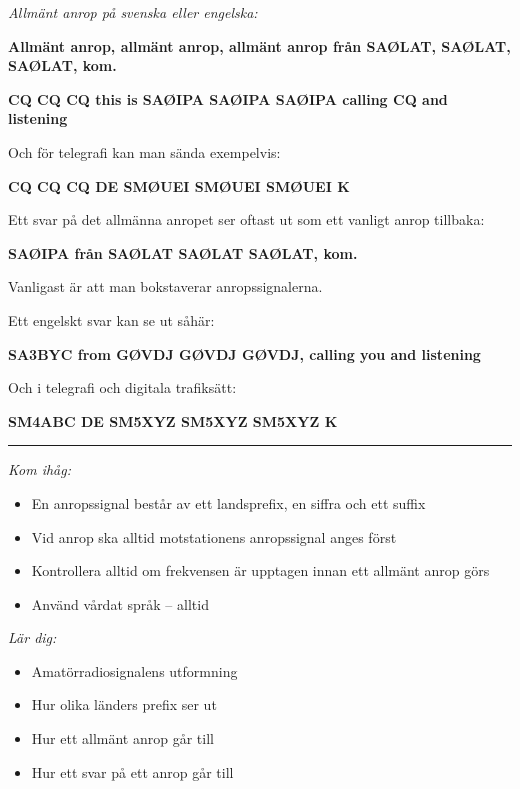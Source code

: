 \textit{Allmänt anrop på svenska eller engelska:}

\textbf{Allmänt anrop, allmänt anrop, allmänt anrop från SAØLAT,
  SAØLAT, SAØLAT, kom.}

\textbf{CQ CQ CQ this is SAØIPA SAØIPA SAØIPA calling CQ and
  listening}

Och för telegrafi kan man sända exempelvis:

\textbf{CQ CQ CQ DE SMØUEI SMØUEI SMØUEI K}

Ett svar på det allmänna anropet ser oftast ut som ett vanligt anrop
tillbaka:

\textbf{SAØIPA från SAØLAT SAØLAT SAØLAT, kom.}

Vanligast är att man bokstaverar anropssignalerna.

Ett engelskt svar kan se ut såhär:

\textbf{SA3BYC from GØVDJ GØVDJ GØVDJ, calling you and listening}

Och i telegrafi och digitala trafiksätt:

\textbf{SM4ABC DE SM5XYZ SM5XYZ SM5XYZ K}

\vspace{1em} \hrule \vspace{1em}

\emph{Kom ihåg:}

\begin{itemize}
  \item En anropssignal består av ett landsprefix, en siffra och ett
    suffix
  \item Vid anrop ska alltid motstationens anropssignal anges först

  \item Kontrollera alltid om frekvensen är upptagen innan ett
    allmänt anrop görs
    
  \item Använd vårdat språk -- alltid
\end{itemize}

\emph{Lär dig:}

\begin{itemize}
\item Amatörradiosignalens utformning
\item Hur olika länders prefix ser ut
\item Hur ett allmänt anrop går till
\item Hur ett svar på ett anrop går till
\end{itemize}
